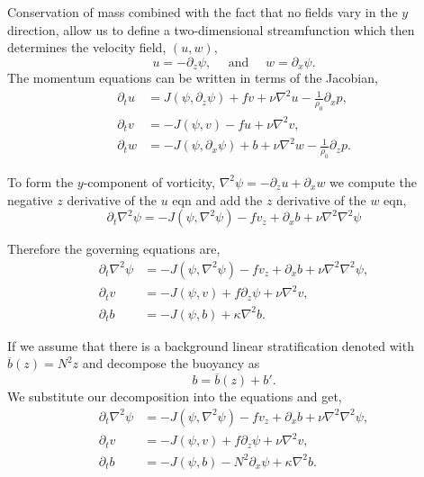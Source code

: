 \documentclass[11pt]{article}
\begin{document}
Conservation of mass combined with the fact that no fields vary in the $y$ direction, allow us to define a two-dimensional streamfunction which then determines the velocity field, $(u,w)$,
$$
u = -\partial_z \psi, 
\quad \mbox{ and } \quad
w = \partial_x \psi.
$$
The momentum equations can be written in terms of the Jacobian,
\begin{align*}
\partial_t u   & =  J(\psi,  \partial_z \psi) + f v  +\nu \nabla^2 u  -  \frac{1}{{\rho}_0} \partial_x p, \\
\partial_t v  & =   - J(\psi, v)  -f u  +\nu \nabla^2 v , \\
\partial_t w   & =  - J(\psi, \partial_x \psi )  + b  +\nu \nabla^2 w  -  \frac{1}{{\rho}_0} \partial_z p.
\end{align*}

To form the $y$-component of vorticity, $\nabla^2 \psi = - \partial_z u + \partial_x w$ we compute the negative $z$ derivative of the $u$ eqn and add the $z$ derivative of the $w$ eqn,
$$
\partial_t \nabla^2 \psi = -J(\psi, \nabla^2 \psi) -  f v_z   + \partial_x b + \nu \nabla^2 \nabla^2 \psi
$$

Therefore the governing equations are,
\begin{align*}
\partial_t \nabla^2 \psi &= -J(\psi, \nabla^2 \psi)-  f v_z   +  \partial_x b + \nu \nabla^2 \nabla^2 \psi, \\
\partial_t v  & =   -J(\psi, v)  + f \partial_z \psi  +\nu \nabla^2 v , \\
\partial_t b & = -J(\psi, b) + \kappa \nabla^2 b.
\end{align*}

If we assume that there is a background linear stratification denoted with $\overline{b}(z) = N^2 z$ and decompose the buoyancy as
$$
b = \overline{b}(z) + b'.
$$
We substitute our decomposition into the equations and get,
\begin{align*}
\partial_t \nabla^2 \psi &= -J(\psi, \nabla^2 \psi)-  f v_z   +  \partial_x b + \nu \nabla^2 \nabla^2 \psi, \\
\partial_t v  & =   -J(\psi, v)  + f \partial_z \psi  +\nu \nabla^2 v , \\
\partial_t b & = -J(\psi, b) - N^2 \partial_x \psi + \kappa \nabla^2 b.
\end{align*}
\end{document}
